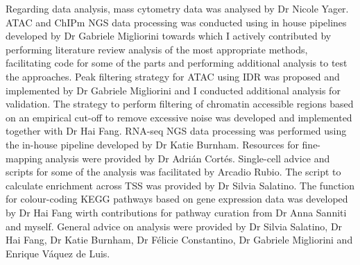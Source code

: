 {\begin{minipage}[t]{1.1\linewidth}
\noindent Regarding data analysis, mass cytometry data was analysed by Dr Nicole Yager. ATAC and ChIPm NGS data processing was conducted using in house pipelines developed by Dr Gabriele Migliorini towards which I actively contributed by performing literature review analysis of the most appropriate methods, facilitating code for some of the parts and performing additional analysis to test the approaches. Peak filtering strategy for ATAC using IDR was proposed and implemented by Dr Gabriele Migliorini and I conducted additional analysis for validation. The strategy to perform filtering of chromatin accessible regions based on an empirical cut-off to remove excessive noise was developed and implemented together with Dr Hai Fang. RNA-seq NGS data processing was performed using the in-house pipeline developed by Dr Katie Burnham. Resources for fine-mapping analysis were provided by Dr Adri\'{a}n Cort\'{e}s. Single-cell advice and scripts for some of the analysis was facilitated by Arcadio Rubio. The script to calculate enrichment across TSS was provided by Dr Silvia Salatino. The function for colour-coding KEGG pathways based on gene expression data was developed by Dr Hai Fang wirth contributions for pathway curation from Dr Anna Sanniti and myself. General advice on analysis were provided by Dr Silvia Salatino, Dr Hai Fang, Dr Katie Burnham, Dr F\'{e}licie Constantino, Dr Gabriele Migliorini and Enrique V\'{a}quez de Luis. 
\end{minipage}}




